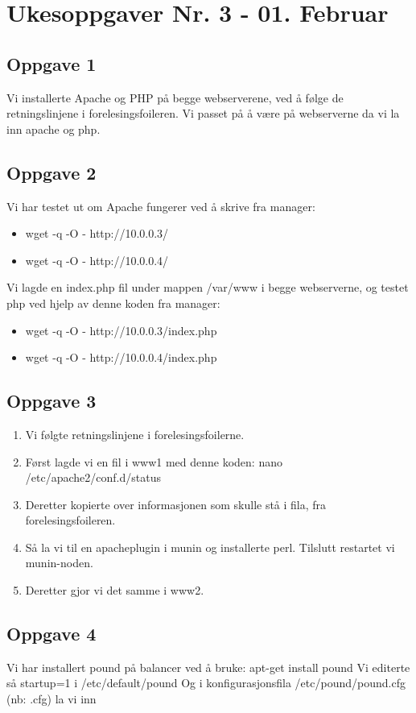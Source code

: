 \documentclass[a4paper, norsk, 12pt]{article}
\begin{document}
\section{Ukesoppgaver Nr. 3 - 01. Februar}
\subsection{Oppgave 1}
Vi installerte Apache og PHP på begge webserverene, ved å følge de retningslinjene i forelesingsfoileren. Vi passet på å være på webserverne da vi la inn apache og php.

\subsection{Oppgave 2}
Vi har testet ut om Apache fungerer ved å skrive fra manager:
\begin{itemize}
\item wget -q -O - http://10.0.0.3/
\item wget -q -O - http://10.0.0.4/
\end{itemize}
Vi lagde en index.php fil under mappen /var/www i begge webserverne, og testet php ved hjelp av denne koden fra manager:
\begin{itemize}
\item wget -q -O - http://10.0.0.3/index.php
\item wget -q -O - http://10.0.0.4/index.php
\end{itemize}

\subsection{Oppgave 3}
\begin{enumerate}
\item Vi følgte retningslinjene i forelesingsfoilerne.
\item Først lagde vi en fil i www1 med denne koden: nano /etc/apache2/conf.d/status
\item Deretter kopierte over informasjonen som skulle stå i fila, fra forelesingsfoileren.
\item Så la vi til en apacheplugin i munin og installerte perl. Tilslutt restartet vi munin-noden.
\item Deretter gjor vi det samme i www2.
\end{enumerate}

\subsection{Oppgave 4}
Vi har installert pound på balancer ved å bruke: apt-get install pound
Vi editerte så startup=1 i /etc/default/pound
Og i konfigurasjonsfila /etc/pound/pound.cfg (nb: .cfg) la vi inn
\end{document}
